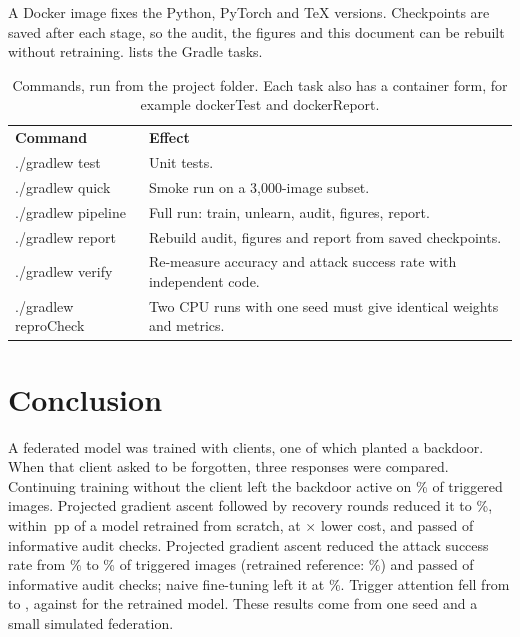 \documentclass[11pt,a4paper]{article}
\newcommand{\code}[1]{{\ttfamily\color{HeadingNavy}#1}}
\newcommand{\pp}{\,pp}
\newcommand{\thead}[1]{\textbf{\color{white}#1}}
\newcommand{\headrow}{\rowcolor{HeadingNavy}}
\begin{document}
A Docker image fixes the Python, PyTorch and \TeX{} versions. Checkpoints are
saved after each stage, so the audit, the figures and this document can be
rebuilt without retraining.  lists the Gradle tasks.

\begin{table}[H]
\centering
\caption[Commands]{Commands, run from the project folder. Each task also has a
container form, for example \code{dockerTest} and \code{dockerReport}.}
\label{tab:commands}
\begin{tabularx}{\textwidth}{@{}>{\ttfamily\small\color{HeadingNavy}}l Y@{}}
\headrow
\thead{\;Command} & \thead{Effect}\\
\;./gradlew test & Unit tests.\\
\;./gradlew quick & Smoke run on a 3,000-image subset.\\
\;./gradlew pipeline & Full run: train, unlearn, audit, figures, report.\\
\;./gradlew report & Rebuild audit, figures and report from saved checkpoints.\\
\;./gradlew verify & Re-measure accuracy and attack success rate with independent code.\\
\;./gradlew reproCheck & Two CPU runs with one seed must give identical weights and metrics.\\
\bottomrule
\end{tabularx}
\end{table}

\section{Conclusion}
\label{sec:conclusion}
A federated model was trained with \NumClients{} clients, one of which planted
a backdoor. When that client asked to be forgotten, three responses were
compared.
\ifPgaAllPassed
Continuing training without the client left the backdoor active on
\AsrFinetune\% of triggered images. Projected gradient ascent followed by
\RecoveryRounds{} recovery rounds reduced it to \AsrPga\%, within \AsrGapPga\pp{} of a model
retrained from scratch, at \SpeedupPga$\times$ lower cost, and passed
\ChecksPassedPga{} of \ChecksInformative{} informative audit checks.
\else
Projected gradient ascent reduced the attack success rate from \AsrOriginal\% to
\AsrPga\% of triggered images (retrained reference: \AsrRetrain\%) and passed
\ChecksPassedPga{} of \ChecksInformative{} informative audit checks; naive
fine-tuning left it at \AsrFinetune\%.
\fi
Trigger attention fell from \AttnOriginal{} to \AttnPga{}, against
\AttnRetrain{} for the retrained model. These results come from one seed and a
small simulated federation.
\end{document}
